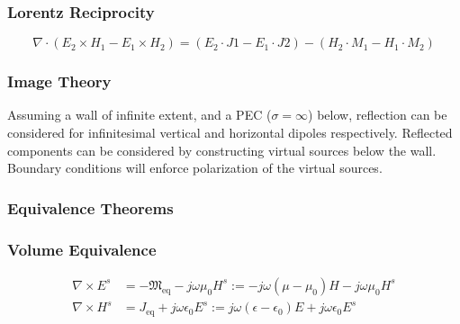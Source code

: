 \documentclass{article}
\numberwithin{equation}{section}
\begin{document}
        \subsubsection{Lorentz Reciprocity}
            \begin{equation}
                \label{eq:lorentzReciprocity}
                \nabla \cdot( E_2 \times H_1 - E_1 \times H_2 ) = ( E_2 \cdot J1 - E_1
                \cdot J2 ) - ( H_2 \cdot M_1 - H_1 \cdot M_2 )
            \end{equation}
        \subsubsection{Image Theory}
            Assuming a wall of infinite extent, and a PEC ($\sigma=\infty$) below,
            reflection can be considered for infinitesimal vertical and horizontal
            dipoles respectively. Reflected components can be considered by constructing
            virtual sources below the wall. Boundary conditions will enforce
            polarization of the virtual sources.
        \subsubsection{Equivalence Theorems}
            \subsubsection*{Volume Equivalence}
            \begin{subequations}
                \begin{align} \label{eq:VolumeEquivalence}
                    \nabla \times E^s &= -\mathfrak{M}_{\text{eq}} - j \omega \mu_0 H^s
                        := -j \omega( \mu - \mu_0 )H -j \omega \mu_0 H^s \\
                    \nabla \times H^s &= J_{\text{eq}} + j \omega \epsilon_0 E^s := j
                        \omega( \epsilon - \epsilon_0 )E + j \omega \epsilon_0 E^s
                \end{align}
            \end{subequations}
\end{document}
